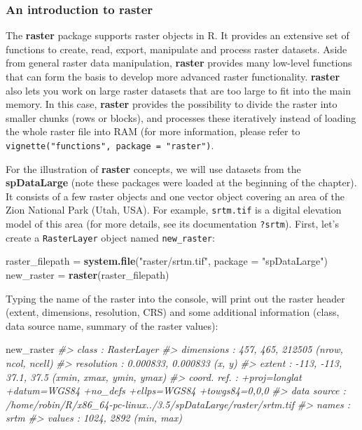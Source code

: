 \documentclass[]{krantz}
\newenvironment{Shaded}{\begin{snugshade}}{\end{snugshade}}
\newcommand{\CommentTok}[1]{\textcolor[rgb]{0.37,0.37,0.37}{\textit{#1}}}
\newcommand{\DataTypeTok}[1]{\textcolor[rgb]{0.27,0.27,0.27}{#1}}
\newcommand{\KeywordTok}[1]{\textcolor[rgb]{0.27,0.27,0.27}{\textbf{#1}}}
\newcommand{\NormalTok}[1]{#1}
\newcommand{\StringTok}[1]{\textcolor[rgb]{0.5,0.5,0.5}{#1}}
\begin{document}
\hypertarget{an-introduction-to-raster}{%
\subsubsection{An introduction to raster}\label{an-introduction-to-raster}}

The \textbf{raster} package supports raster objects in R.
It provides an extensive set of functions to create, read, export, manipulate and process raster datasets.
Aside from general raster data manipulation, \textbf{raster} provides many low-level functions that can form the basis to develop more advanced raster functionality.
\textbf{raster} also lets you work on large raster datasets that are too large to fit into the main memory.
In this case, \textbf{raster} provides the possibility to divide the raster into smaller chunks (rows or blocks), and processes these iteratively instead of loading the whole raster file into RAM (for more information, please refer to \texttt{vignette("functions",\ package\ =\ "raster")}.

For the illustration of \textbf{raster} concepts, we will use datasets from the \textbf{spDataLarge} (note these packages were loaded at the beginning of the chapter).
It consists of a few raster objects and one vector object covering an area of the Zion National Park (Utah, USA).
For example, \texttt{srtm.tif} is a digital elevation model of this area (for more details, see its documentation \texttt{?srtm}).
First, let's create a \texttt{RasterLayer} object named \texttt{new\_raster}:

\begin{Shaded}
\begin{Highlighting}[]
\NormalTok{raster_filepath =}\StringTok{ }\KeywordTok{system.file}\NormalTok{(}\StringTok{"raster/srtm.tif"}\NormalTok{, }\DataTypeTok{package =} \StringTok{"spDataLarge"}\NormalTok{)}
\NormalTok{new_raster =}\StringTok{ }\KeywordTok{raster}\NormalTok{(raster_filepath)}
\end{Highlighting}
\end{Shaded}

Typing the name of the raster into the console, will print out the raster header (extent, dimensions, resolution, CRS) and some additional information (class, data source name, summary of the raster values):

\begin{Shaded}
\begin{Highlighting}[]
\NormalTok{new_raster}
\CommentTok{#> class       : RasterLayer }
\CommentTok{#> dimensions  : 457, 465, 212505  (nrow, ncol, ncell)}
\CommentTok{#> resolution  : 0.000833, 0.000833  (x, y)}
\CommentTok{#> extent      : -113, -113, 37.1, 37.5  (xmin, xmax, ymin, ymax)}
\CommentTok{#> coord. ref. : +proj=longlat +datum=WGS84 +no_defs +ellps=WGS84 +towgs84=0,0,0 }
\CommentTok{#> data source : /home/robin/R/x86_64-pc-linux../3.5/spDataLarge/raster/srtm.tif }
\CommentTok{#> names       : srtm }
\CommentTok{#> values      : 1024, 2892  (min, max)}
\end{Highlighting}
\end{Shaded}
\end{document}

